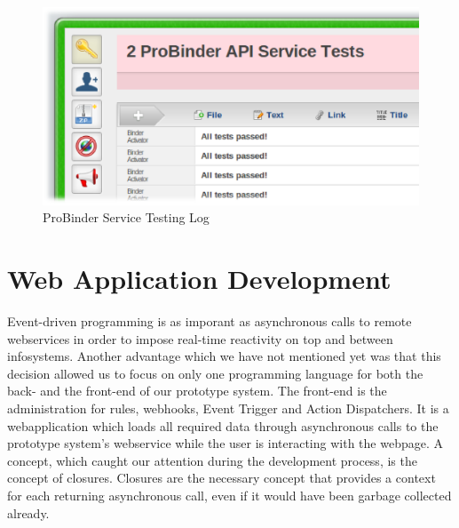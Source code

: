 \begin{figure}[!ht]
	\centering
  \includegraphics[width=\textwidth]{figures/PBServiceTesting}
	\caption{ProBinder Service Testing Log}
	\label{fig:PBServiceTesting}
\end{figure}


\section{Web Application Development}
Event-driven programming is as imporant as asynchronous calls to remote \textrm{\glspl{webservice}} in order to impose real-time reactivity on top and between \textrm{\glspl{infosystem}}.
Another advantage which we have not mentioned yet was that this decision allowed us to focus on only one programming language for both the back- and the front-end of our prototype system.
The front-end is the administration for rules, \textrm{\glspl{webhook}}, \textrm{Event Trigger} and \textrm{Action Dispatchers}.
It is a \textrm{\gls{webapplication}} which loads all required data through asynchronous calls to the prototype system's \textrm{\gls{webservice}} while the user is interacting with the webpage.
A concept, which caught our attention during the development process, is the concept of closures.
Closures are the necessary concept that provides a context for each returning asynchronous call, even if it would have been garbage collected already.



